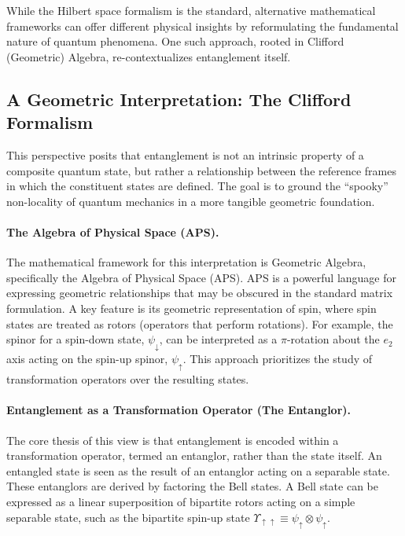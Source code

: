 While the Hilbert space formalism is the standard, alternative mathematical
frameworks can offer different physical insights by reformulating the fundamental
nature of quantum phenomena. One such approach, rooted in Clifford (Geometric)
Algebra, re-contextualizes entanglement itself.

\subsection{A Geometric Interpretation: The Clifford Formalism}
\label{sub:clifford_formalism}

This perspective posits that entanglement is not an intrinsic property of a
composite quantum state, but rather a relationship between the reference
frames in which the constituent states are defined. The goal is to ground
the ``spooky'' non-locality of quantum mechanics in a more tangible geometric
foundation.

\paragraph{The Algebra of Physical Space (APS).}
The mathematical framework for this interpretation is Geometric Algebra,
specifically the Algebra of Physical Space (APS). APS is a powerful language
for expressing geometric relationships that may be obscured in the standard
matrix formulation. A key feature is its geometric representation of spin, where
spin states are treated as rotors (operators that perform rotations).
For example, the spinor for a spin-down state, $\psi_{\downarrow}$, can be
interpreted as a $\pi$-rotation about the $e_2$ axis acting on the spin-up
spinor, $\psi_{\uparrow}$. This approach prioritizes the study of
transformation operators over the resulting states.

\paragraph{Entanglement as a Transformation Operator (The Entanglor).}
The core thesis of this view is that entanglement is encoded within a
transformation operator, termed an entanglor, rather than the state
itself. An entangled state is seen as the result of an entanglor acting on
a separable state. These entanglors are derived by factoring the Bell states.
A Bell state can be expressed as a linear superposition of bipartite rotors
acting on a simple separable state, such as the bipartite spin-up state
$\Upsilon_{\uparrow\uparrow} \equiv \psi_{\uparrow} \otimes \psi_{\uparrow}$.

